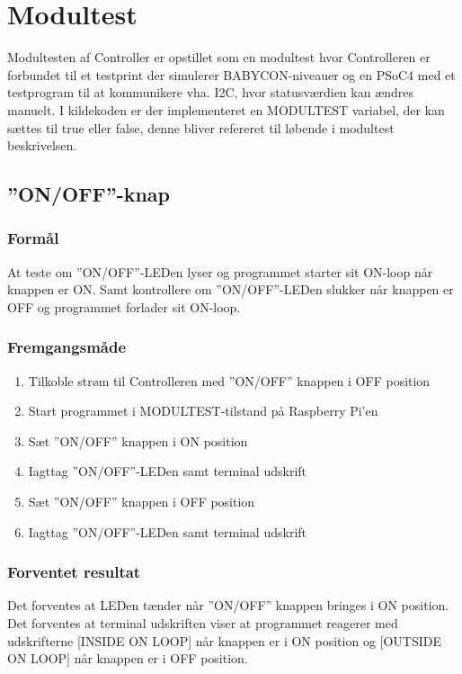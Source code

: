 \newpage
\section{Modultest}

Modultesten af Controller er opstillet som en modultest hvor Controlleren er forbundet til et testprint der simulerer BABYCON-niveauer og en PSoC4 med et testprogram til at kommunikere vha. I2C, hvor statusværdien kan ændres manuelt. I kildekoden er der implementeret en MODULTEST variabel, der kan sættes til true eller false, denne bliver refereret til løbende i modultest beskrivelsen.

\subsection*{''ON/OFF''-knap}

\subsubsection*{Formål}

At teste om ''ON/OFF''-LEDen lyser og programmet starter sit ON-loop når knappen er ON. Samt kontrollere om ''ON/OFF''-LEDen slukker når knappen er OFF og programmet forlader sit ON-loop.

\subsubsection*{Fremgangsmåde}
\begin{enumerate}
\item Tilkoble strøm til Controlleren med ''ON/OFF'' knappen i OFF position
\item Start programmet i MODULTEST-tilstand på Raspberry Pi'en
\item Sæt ''ON/OFF'' knappen i ON position
\item Iagttag ''ON/OFF''-LEDen samt terminal udskrift
\item Sæt ''ON/OFF'' knappen i OFF position
\item Iagttag ''ON/OFF''-LEDen samt terminal udskrift
\end{enumerate}

\subsubsection*{Forventet resultat} 
Det forventes at LEDen tænder når ''ON/OFF'' knappen bringes i ON position. Det forventes at terminal udskriften viser at programmet reagerer med udskrifterne [INSIDE ON LOOP] når knappen er i ON position og [OUTSIDE ON LOOP] når knappen er i OFF position.

